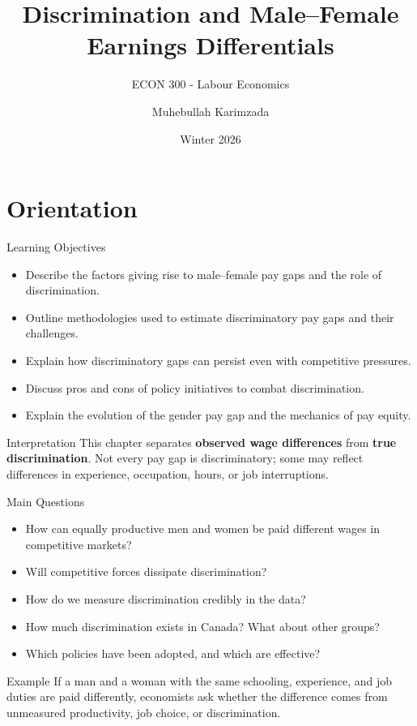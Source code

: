\documentclass[aspectratio=169]{beamer}
\title{\textbf{Discrimination and Male--Female Earnings Differentials}}
\subtitle{{\large ECON 300 - Labour Economics}}
\author{Muhebullah Karimzada}
\date{Winter 2026}
\begin{document}
\begin{frame}[plain]
  \titlepage
\end{frame}

\section{Orientation}

\begin{frame}{Learning Objectives}
\transfade
\begin{itemize}
  \item Describe the factors giving rise to male--female pay gaps and the role of discrimination.
  \item Outline methodologies used to estimate discriminatory pay gaps and their challenges.
  \item Explain how discriminatory gaps can persist even with competitive pressures.
  \item Discuss pros and cons of policy initiatives to combat discrimination.
  \item Explain the evolution of the gender pay gap and the mechanics of pay equity.
\end{itemize}

\begin{block}{Interpretation}
This chapter separates \textbf{observed wage differences} from \textbf{true discrimination}. Not every pay gap is discriminatory; some may reflect differences in experience, occupation, hours, or job interruptions.
\end{block}
\end{frame}

\begin{frame}{Main Questions}
\transfade
\begin{itemize}
  \item How can equally productive men and women be paid different wages in competitive markets?
  \item Will competitive forces dissipate discrimination?
  \item How do we measure discrimination credibly in the data?
  \item How much discrimination exists in Canada? What about other groups?
  \item Which policies have been adopted, and which are effective?
\end{itemize}

\begin{exampleblock}{Example}
If a man and a woman with the same schooling, experience, and job duties are paid differently, economists ask whether the difference comes from unmeasured productivity, job choice, or discrimination.
\end{exampleblock}
\end{frame}
\end{document}

